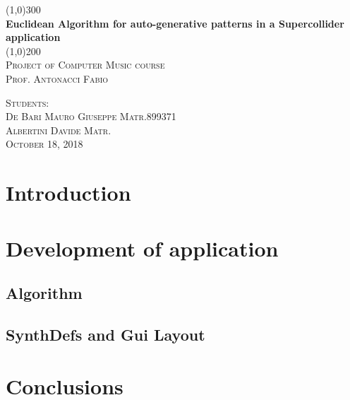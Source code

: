 \documentclass{report}
\begin{document}
\begin{titlepage}
	\begin{center}
	\line(1,0){300}\\
	[0.25in]
	\huge{\bfseries Euclidean Algorithm for auto-generative patterns in a Supercollider application}\\
	[2mm]
	\line(1,0){200}\\
	[1.5cm]
	\textsc{\LARGE Project of Computer Music course}\\
	[0.75cm]
	\textsc{\Large Prof. Antonacci Fabio}\\
	[9cm]
	\end{center}
	\begin{flushright}
	\textsc{\large  Students:\\
	De Bari Mauro Giuseppe Matr.899371 \\
	Albertini Davide Matr. \\
	October 18, 2018 \\}
	\end{flushright}
\end{titlepage}

\tableofcontents
\newpage

\section{Introduction}


\section{Development of application}

\subsection{Algorithm}

\subsection{SynthDefs and Gui Layout}

\section{Conclusions}

\end{document}
